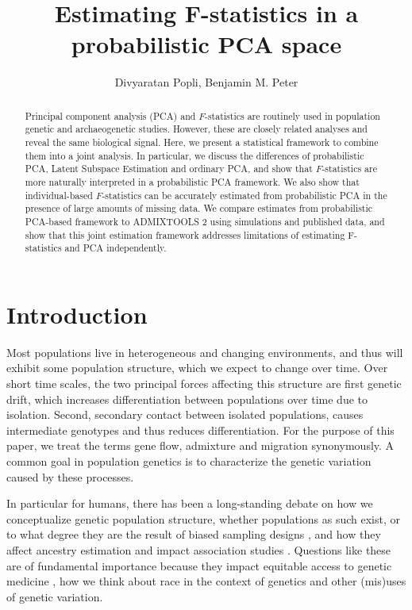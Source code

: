 \documentclass[12pt, letterpaper]{article}
\title{Estimating F-statistics in a probabilistic PCA space}
\author{Divyaratan Popli, Benjamin M. Peter}
\begin{document}
\maketitle


\begin{abstract}

\noindent Principal component analysis (PCA) and $F$-statistics are routinely used in population genetic and archaeogenetic studies. However, these are closely related analyses and reveal the same biological signal. Here, we present a statistical framework to combine them into a joint analysis. In particular, we discuss the differences of probabilistic PCA, Latent Subspace Estimation and ordinary PCA, and show that $F$-statistics are more naturally interpreted in a probabilistic PCA framework. We also show that individual-based $F$-statistics can be accurately estimated from probabilistic PCA in the presence of large amounts of missing data. We compare estimates from probabilistic PCA-based framework to ADMIXTOOLS 2 using simulations and published data, and show that this joint estimation framework addresses limitations of estimating F-statistics and PCA  independently.

\end{abstract}

\section{Introduction}
Most populations live in heterogeneous and changing environments, and thus will exhibit some population structure, which we expect to change over time. Over short time scales, the two principal forces affecting this structure are first genetic drift, which increases differentiation between populations over time due to isolation. Second, secondary contact between isolated populations, causes intermediate genotypes and thus reduces differentiation. For the purpose of this paper, we treat the terms gene flow, admixture and migration synonymously. A common goal in population genetics is to characterize the genetic variation caused by these processes.

In particular for humans, there has been a long-standing debate on how we conceptualize genetic population structure, whether populations as such exist, or to what degree they are the result of biased sampling designs \cite{serre_evidence_2004, rosenberg_clines_2005, peter_genetic_2020}, and how they affect ancestry estimation \cite{mathieson_what_2020, simon_contribution_2023} and impact association studies \cite{price_principal_2006}. Questions like these are of fundamental importance because they impact equitable access to genetic medicine \cite{popejoy_genomics_2016}, how we think about race in the context of genetics \cite{lewontin_apportionment_1972, novembre_background_2022} and other (mis)uses of genetic variation.
\end{document}
